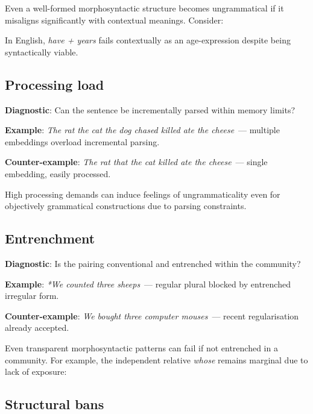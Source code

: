 \documentclass[12pt]{article}
\begin{document}
Even a well-formed morphosyntactic structure becomes ungrammatical if it misaligns significantly with contextual meanings. Consider:

\z

In English, \textit{have + years} fails contextually as an age-expression despite being syntactically viable.

\subsection{Processing load}

\begin{tcolorbox}[colback=lsLightBlue!30]
\textbf{Diagnostic}: Can the sentence be incrementally parsed within memory limits?

\textbf{Example}: \textit{The rat the cat the dog chased killed ate the cheese}~— multiple embeddings overload incremental parsing.

\textbf{Counter-example}: \textit{The rat that the cat killed ate the cheese}~— single embedding, easily processed.
\end{tcolorbox}

High processing demands can induce feelings of ungrammaticality even for objectively grammatical constructions due to parsing constraints.

\subsection{Entrenchment}

\begin{tcolorbox}[colback=lsLightBlue!30]
\textbf{Diagnostic}: Is the pairing conventional and entrenched within the community?

\textbf{Example}: \textit{*We counted three sheeps}~— regular plural blocked by entrenched irregular form.

\textbf{Counter-example}: \textit{We bought three computer mouses}~— recent regularisation already accepted.
\end{tcolorbox}

Even transparent morphosyntactic patterns can fail if not entrenched in a community. For example, the independent relative \textit{whose} remains marginal due to lack of exposure:

\z

\subsection{Structural bans}
\end{document}

